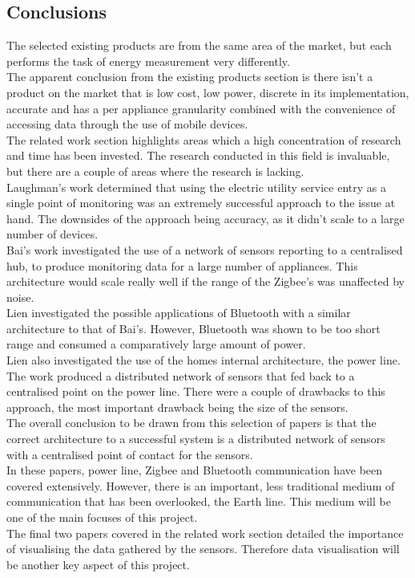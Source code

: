 \documentclass[draft,preprint,12pt,3p]{elsarticle}
\begin{document}
\subsection{Conclusions}
The selected existing products are from the same area of the market, but each performs the task of energy measurement very differently.\\
The apparent conclusion from the existing products section is there isn't a product on the market that is low cost, low power, discrete in its implementation, accurate and has a per appliance granularity combined with the convenience of accessing data through the use of mobile devices.\\
The related work section highlights areas which a high concentration of research and time has been invested. The research conducted in this field is invaluable, but there are a couple of areas where the research is lacking.\\
Laughman's work determined that using the electric utility service entry as a single point of monitoring was an extremely successful approach to the issue at hand. The downsides of the approach being accuracy, as it didn't scale to a large number of devices.\\
Bai's work investigated the use of a network of sensors reporting to a centralised hub, to produce monitoring data for a large number of appliances. This architecture would scale really well if the range of the Zigbee's was unaffected by noise.\\
Lien investigated the possible applications of Bluetooth with a similar architecture to that of Bai's. However, Bluetooth was shown to be too short range and consumed a comparatively large amount of power.\\
Lien also investigated the use of the homes internal architecture, the power line. The work produced a distributed network of sensors that fed back to a centralised point on the power line. There were a couple of drawbacks to this approach, the most important drawback being the size of the sensors.\\
The overall conclusion to be drawn from this selection of papers is that the correct architecture to a successful system is a distributed network of sensors with a centralised point of contact for the sensors.\\
In these papers, power line, Zigbee and Bluetooth communication have been covered extensively. However, there is an important, less traditional medium of communication that has been overlooked, the Earth line. This medium will be one of the main focuses of this project.\\
The final two papers covered in the related work section detailed the importance of visualising the data gathered by the sensors. Therefore data visualisation will be another key aspect of this project.
\end{document}
